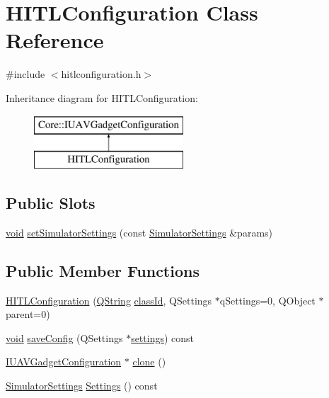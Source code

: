 \hypertarget{class_h_i_t_l_configuration}{\section{\-H\-I\-T\-L\-Configuration \-Class \-Reference}
\label{class_h_i_t_l_configuration}
}


{\ttfamily \#include $<$hitlconfiguration.\-h$>$}

\-Inheritance diagram for \-H\-I\-T\-L\-Configuration\-:\begin{figure}[H]
\begin{center}
\leavevmode
\includegraphics[height=2.000000cm]{class_h_i_t_l_configuration}
\end{center}
\end{figure}
\subsection*{\-Public \-Slots}
\begin{DoxyCompactItemize}
\item 
\hyperlink{group___u_a_v_objects_plugin_ga444cf2ff3f0ecbe028adce838d373f5c}{void} \hyperlink{group___h_i_t_l_plugin_gacd597e5682d8dbe29504ed7c45245695}{set\-Simulator\-Settings} (const \hyperlink{group___h_i_t_l_plugin_ga052199f1328d3002bce3e45345aa7f4e}{\-Simulator\-Settings} \&params)
\end{DoxyCompactItemize}
\subsection*{\-Public \-Member \-Functions}
\begin{DoxyCompactItemize}
\item 
\hyperlink{group___h_i_t_l_plugin_ga7d0ecee89fe45b55113d77ae668a7777}{\-H\-I\-T\-L\-Configuration} (\hyperlink{group___u_a_v_objects_plugin_gab9d252f49c333c94a72f97ce3105a32d}{\-Q\-String} \hyperlink{group___core_plugin_gac953657221ba7fda967ada0408332641}{class\-Id}, \-Q\-Settings $\ast$q\-Settings=0, \-Q\-Object $\ast$parent=0)
\item 
\hyperlink{group___u_a_v_objects_plugin_ga444cf2ff3f0ecbe028adce838d373f5c}{void} \hyperlink{group___h_i_t_l_plugin_ga8ae31be95aaf6385511e9387aa0a49b3}{save\-Config} (\-Q\-Settings $\ast$\hyperlink{group___h_i_t_l_plugin_ga961f33f3db5f79daaf792a4999ac5c06}{settings}) const 
\item 
\hyperlink{group___core_plugin_gacdfdf0b1e39b5002472b76b6564ce51f}{\-I\-U\-A\-V\-Gadget\-Configuration} $\ast$ \hyperlink{group___h_i_t_l_plugin_gaf448a961e8785490a4dcc5187d7edbe6}{clone} ()
\item 
\hyperlink{group___h_i_t_l_plugin_ga052199f1328d3002bce3e45345aa7f4e}{\-Simulator\-Settings} \hyperlink{group___h_i_t_l_plugin_ga993f772c2a086edf053d851849caa984}{\-Settings} () const 
\end{DoxyCompactItemize}
